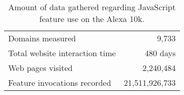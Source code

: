\begin{table}[ht]
  \centering
  \begin{tabular}{ l r }
    \toprule
      Domains measured                    &  9,733 \\
      Total website interaction time      &  480 days \\
      Web pages visited                   &  2,240,484    \\
      Feature invocations recorded        &  21,511,926,733 \\
    \bottomrule
  \end{tabular}
  \caption{Amount of data gathered regarding JavaScript feature use on the Alexa 10k.}
  \label{fig:results-vanity-stats}
\end{table}
